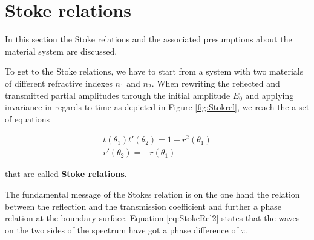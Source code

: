 \section{Stoke relations}
\label{sec:StokeRel}

In this section the Stoke relations and the associated presumptions about the 
material system are discussed. 

To get to the Stoke relations, we have to start from a system with two materials of different 
refractive indexes $n_1$ and $n_2$. When rewriting the reflected and transmitted partial amplitudes through the initial
amplitude $E_{0}$ and applying invariance in regards to time as depicted in Figure \ref{fig:Stokrel}, we reach the a set of equations

\begin{gather}
    t(\theta_1)t'(\theta_2) = 1 - r^2(\theta_1)\\
    r'(\theta_2) = -r (\theta_1) \label{eq:StokeRel2}
\end{gather}

that are called \textbf{Stoke relations}. 

The fundamental message of the Stokes relation is on the one hand the relation between the reflection and the transmission 
coefficient and further a phase relation at the boundary surface. Equation \ref{eq:StokeRel2} states that the  waves on the two sides 
of the spectrum have got a phase difference of $\pi$.

